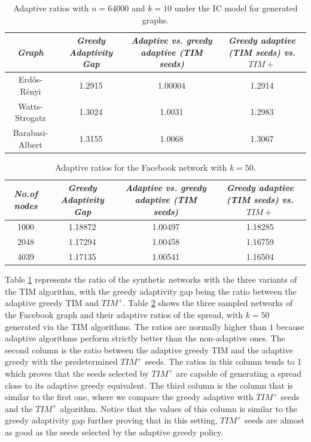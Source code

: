  \begin{table} [ht]
    \centering
    \begin{adjustbox}{width=1\textwidth}
    \begin{tabular}{ | c | c | c | c | }
    \hline
    \textit{Graph}& \textit{Greedy Adaptivity Gap}& \textit{Adaptive vs. greedy adaptive (TIM seeds)}& \textit{Greedy adaptive (TIM seeds) vs. $TIM+$}\\[2ex]
     \hline
    Erdős-Rényi& 1.2915& 1.00004& 1.2914\\ [2ex]
    Watts-Strogatz& 1.3024& 1.0031& 1.2983\\[2ex]
    Barabasi-Albert& 1.3155& 1.0068& 1.3067 \\[2ex]
    \hline
    \end{tabular}
    \end{adjustbox}
    \caption{Adaptive ratios with $n=64000$ and $k=10$ under the IC model for generated graphs.}
    \label{AG}
    \end{table}



    \begin{table} [ht]
    \centering
    \begin{adjustbox}{width=1\textwidth}
    \begin{tabular}{ | c | c | c | c | }
    \hline
    \textit{No.of nodes}& \textit{Greedy Adaptivity Gap}& \textit{Adaptive vs. greedy adaptive (TIM seeds)}& \textit{Greedy adaptive (TIM seeds) vs. $TIM+$}\\[2ex]
     \hline
    1000& 1.18872& 1.00497& 1.18285\\ [2ex]
    2048& 1.17294& 1.00458& 1.16759\\[2ex]
    4039& 1.17135& 1.00541& 1.16504\\[2ex]
    \hline
    \end{tabular}
    \end{adjustbox}
    \caption{Adaptive ratios for the Facebook network with $k=50$.}
    \label{FB}
    \end{table}

Table \ref{AG} represents the ratio of the synthetic networks with the three variants of the TIM algorithm, with the greedy adaptivity gap being the ratio between the adaptive greedy TIM and $TIM^+$. Table \ref{FB} shows the three sampled networks of the Facebook graph and their adaptive ratios of the spread, with $k=50$ generated via the TIM algorithms. The ratios are normally higher than $1$ because adaptive algorithms perform strictly better than the non-adaptive ones. The second column is the ratio between the adaptive greedy TIM and the adaptive greedy with the predetermined $TIM^+$ seeds. The ratios in this column tends to 1 which proves that the seeds selected by $TIM^+$ are capable of generating a spread close to its adaptive greedy equivalent. The third column is the column that is similar to the first one, where we compare the greedy adaptive with $TIM^+$ seeds and the $TIM^+$ algorithm. Notice that the values of this column is similar to the greedy adaptivity gap further proving that in this setting, $TIM^+$ seeds are almost as good as the seeds selected by the adaptive greedy policy.





